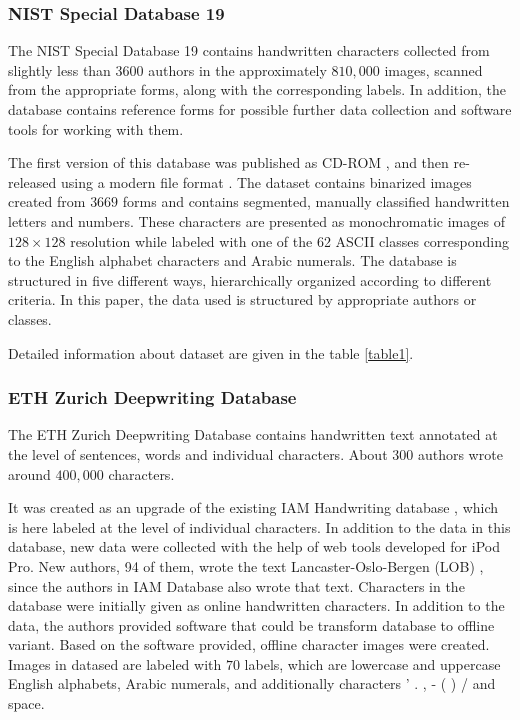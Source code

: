 \documentclass{article}
\begin{document}
\subsubsection{NIST Special Database 19}

The NIST Special Database 19 \citet{nist} contains handwritten characters collected from slightly less than $3600$ authors in the approximately $810,000$ images, 
scanned from the appropriate forms, along with the corresponding labels. 
In addition, the database contains reference forms for possible further data collection and software tools for working with them. 

The first version of this database was published as CD-ROM \citet{nistv0}, and then re-released using a modern file format \citet{nist}. 
The dataset contains binarized images created from $3669$ forms and contains segmented, manually classified handwritten letters and numbers. 
These characters are presented as monochromatic images of $128 \times 128$ resolution while labeled with one of the 62 ASCII classes corresponding to the English alphabet characters and Arabic numerals. 
The database is structured in five different ways, hierarchically organized according to different criteria. 
In this paper, the data used is structured by appropriate authors or classes. 

Detailed information about dataset are given in the table \ref{table1}.  

\subsubsection{ETH Zurich Deepwriting Database}

The ETH Zurich Deepwriting Database\cite{deepwriting} contains handwritten text annotated at the level of sentences, words and individual characters. 
About $300$ authors wrote around $400,000$ characters. 

It was created as an upgrade of the existing IAM Handwriting database \citet{iam}, which is here labeled at the level of individual characters. 
In addition to the data in this database, new data were collected with the help of web tools developed for iPod Pro. 
New authors, 94 of them, wrote the text Lancaster-Oslo-Bergen (LOB) \citet{lob}, since the authors in IAM Database also wrote that text. 
Characters in the database were initially given as online handwritten characters. 
In addition to the data, the authors provided software that could be transform database to offline variant. 
Based on the software provided, offline character images were created. 
Images in datased are labeled with $70$ labels, which are lowercase and uppercase English alphabets, Arabic numerals, and additionally characters 
' . , - ( ) / and space. 
\end{document}
